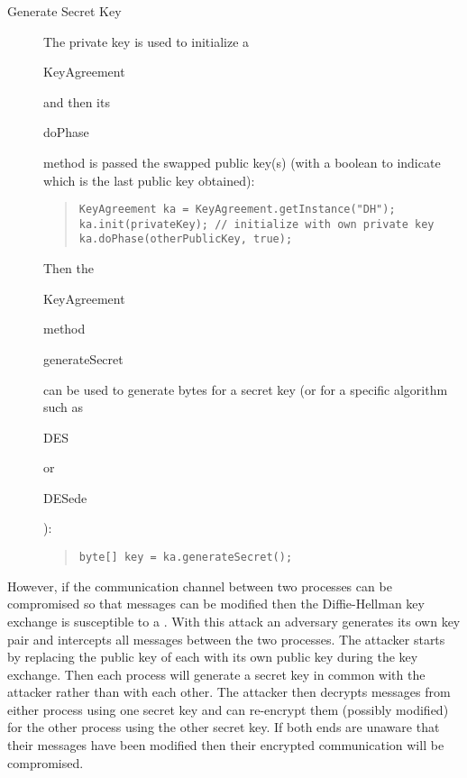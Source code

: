 \begin{description}
  \item[Generate Secret Key]
  The private key is used to initialize a \begin{code}KeyAgreement\end{code}
  and then its \begin{code}doPhase\end{code} method is passed the swapped public key(s)
  (with a boolean to indicate which is the last public key obtained):
\begin{quote}\begin{code}\begin{verbatim}
KeyAgreement ka = KeyAgreement.getInstance("DH");
ka.init(privateKey); // initialize with own private key
ka.doPhase(otherPublicKey, true);
\end{verbatim}\end{code}\end{quote}
  Then the \begin{code}KeyAgreement\end{code} method \begin{code}generateSecret\end{code}
  can be used to generate bytes for a secret key (or for a specific
  algorithm such as \begin{code}DES\end{code} or \begin{code}DESede\end{code}):
\begin{quote}\begin{code}\begin{verbatim}
byte[] key = ka.generateSecret();
\end{verbatim}\end{code}\end{quote}

\end{description}

However, if the communication channel between two processes
can be compromised so that messages can be modified then
the Diffie-Hellman key exchange is susceptible to a .
With this attack an adversary generates its own key pair and
intercepts all messages between the two processes.
The attacker starts by replacing the public key
of each with its own public key during the key exchange.
Then each process will generate a secret key in common
with the attacker rather than with each other.
The attacker then decrypts messages from either process using one secret
key and can re-encrypt them (possibly modified) for the other process using
the other secret key.
If both ends are unaware that their messages have been modified then their
encrypted communication will be compromised.

